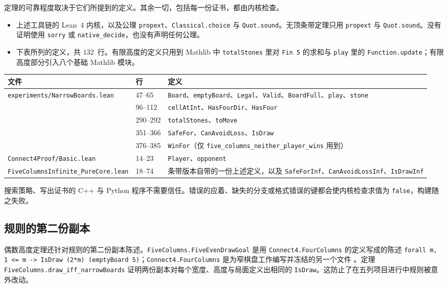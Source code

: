 \documentclass[11pt,a4paper]{article}
\theoremstyle{zhthm}
\newcommand{\code}[1]{{\upshape\texttt{\small\nolinkurl{#1}}}}
\newcommand{\lst}[1]{{\upshape\frenchspacing\texttt{\small #1}}}
\begin{document}
定理的可靠程度取决于它们所提到的定义。其余一切，包括每一份证书，都由内核检查。
\begin{itemize}
  \item 上述工具链的 Lean~4 内核，以及公理 \code{propext}、\code{Classical.choice} 与 \code{Quot.sound}。无顶条带定理只用 \code{propext} 与 \code{Quot.sound}。没有证明使用 \code{sorry} 或 \code{native_decide}，也没有声明任何公理。
  \item 下表所列的定义，共 $132$~行。有限高度的定义只用到 Mathlib 中 \code{totalStones} 里对 \code{Fin 5} 的求和与 \code{play} 里的 \code{Function.update}；有限高度部分引入八个基础 Mathlib 模块。
\end{itemize}
\begin{center}
\small
\begin{tabularx}{\linewidth}{@{}l l Y@{}}
\toprule
\textbf{文件} & \textbf{行} & \textbf{定义} \\
\midrule
\code{experiments/NarrowBoards.lean} & 47--65 & \code{Board}、\code{emptyBoard}、\code{Legal}、\code{Valid}、\code{BoardFull}、\code{play}、\code{stone} \\
 & 96--112 & \code{cellAtInt}、\code{HasFourDir}、\code{HasFour} \\
 & 290--292 & \code{totalStones}、\code{toMove} \\
 & 351--366 & \code{SafeFor}、\code{CanAvoidLoss}、\code{IsDraw} \\
 & 376--385 & \code{WinFor}（仅 \code{five_columns_neither_player_wins} 用到） \\
\code{Connect4Proof/Basic.lean} & 14--23 & \code{Player}、\code{opponent} \\
\code{FiveColumnsInfinite_PureCore.lean} & 18--74 & 条带版本自带的一份上述定义，以及 \code{SafeForInf}、\code{CanAvoidLossInf}、\code{IsDrawInf} \\
\bottomrule
\end{tabularx}
\end{center}
搜索策略、写出证书的 C++ 与 Python 程序不需要信任。错误的应着、缺失的分支或格式错误的键都会使内核检查求值为 \code{false}，构建随之失败。

\subsection{规则的第二份副本}
\label{sec:frozen}

偶数高度定理还针对规则的第二份副本陈述。\code{FiveColumns.FiveEvenDrawGoal} 是用 \code{Connect4.FourColumns} 的定义写成的陈述 \lst{forall m, 1 <= m -> IsDraw (2*m) (emptyBoard 5)}；\code{Connect4.FourColumns} 是为窄棋盘工作编写并冻结的另一个文件 \cite{narrow14,fourcol}。定理 \code{FiveColumns.draw_iff_narrowBoards} 证明两份副本对每个宽度、高度与局面定义出相同的 \code{IsDraw}。这防止了在五列项目进行中规则被意外改动。
\end{document}
